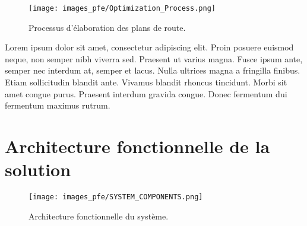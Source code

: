\medskip

\begin{figure}[hbt!]
  \centering
  \texttt{[image: images\_pfe/Optimization\_Process.png]}
  \caption{Processus d'élaboration des plans de route.}
  \label{fig:optimisation-process}
\end{figure}
\FloatBarrier

Lorem ipsum dolor sit amet, consectetur adipiscing elit. Proin posuere euismod neque, non semper nibh viverra sed. Praesent ut varius magna. Fusce ipsum ante, semper nec interdum at, semper et lacus. Nulla ultrices magna a fringilla finibus. Etiam sollicitudin blandit ante. Vivamus blandit rhoncus tincidunt. Morbi sit amet congue purus. Praesent interdum gravida congue. Donec fermentum dui fermentum maximus rutrum.



\section{Architecture fonctionnelle de la solution}

\begin{figure}[hbt!]
  \centering
  \texttt{[image: images\_pfe/SYSTEM\_COMPONENTS.png]}
  \caption{Architecture fonctionnelle du système.}
  \label{fig:functional-architecture}
\end{figure}
\FloatBarrier 


